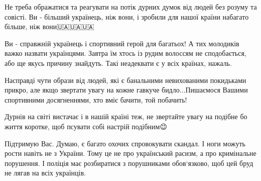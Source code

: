 \begin{itemize}
Не треба ображатися та реагувати на потік дурних думок від людей без розуму та
совісті. Ви - більший українець, ніж вони, і зробили для нашої країни набагато
більше, ніж вони🇺🇦🇺🇦🇺🇦

 

Ви - справжній українець і спортивний герой для багатьох! А тих молодиків важко
назвати українцями. Завтра їм хтось із рудим волоссям не сподобається, або ще
якусь причину знайдуть. Такі неадеквати є у всіх країнах, нажаль.


 

Насправді чути образи від людей, які є банальними невихованими покидьками
прикро, але якщо звертати увагу на кожне гавкуче бидло...Пишаємося Вашими
спортивними досягненнями, хто вміє бачити, той побачить!


 

Дурнів на світі вистачає і в нашій країні теж, не звертайте увагу на подібне бо
життя коротке, щоб псувати собі настрій подібним😉


 

Підтримую Вас. Думаю, є багато охочих спровокувати скандал. І ноги можуть рости
навіть не з України. Тому це не про український расизм, а про кримінальне
порушення. І поліція має розбиратися з порушниками обов‘язково, щоб цей бруд не
лягав на всіх українців.

\begin{itemize}
 

\end{itemize}
\end{itemize}
